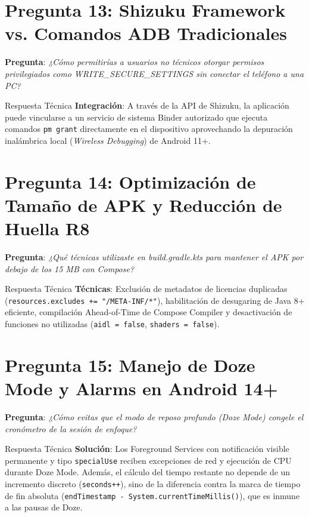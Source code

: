 \documentclass[11pt,a4paper,oneside]{report}
\begin{document}
\section{Pregunta 13: Shizuku Framework vs. Comandos ADB Tradicionales}
\textbf{Pregunta}: \textit{¿Cómo permitirías a usuarios no técnicos otorgar permisos privilegiados como WRITE\_SECURE\_SETTINGS sin conectar el teléfono a una PC?}
\begin{starbox}{Respuesta Técnica}
\textbf{Integración}: A través de la API de Shizuku, la aplicación puede vincularse a un servicio de sistema Binder autorizado que ejecuta comandos \texttt{pm grant} directamente en el dispositivo aprovechando la depuración inalámbrica local (\textit{Wireless Debugging}) de Android 11+.
\end{starbox}

\section{Pregunta 14: Optimización de Tamaño de APK y Reducción de Huella R8}
\textbf{Pregunta}: \textit{¿Qué técnicas utilizaste en build.gradle.kts para mantener el APK por debajo de los 15 MB con Compose?}
\begin{starbox}{Respuesta Técnica}
\textbf{Técnicas}: Exclusión de metadatos de licencias duplicadas (\texttt{resources.excludes += "/META-INF/*"}), habilitación de desugaring de Java 8+ eficiente, compilación Ahead-of-Time de Compose Compiler y desactivación de funciones no utilizadas (\texttt{aidl = false}, \texttt{shaders = false}).
\end{starbox}

\section{Pregunta 15: Manejo de Doze Mode y Alarms en Android 14+}
\textbf{Pregunta}: \textit{¿Cómo evitas que el modo de reposo profundo (Doze Mode) congele el cronómetro de la sesión de enfoque?}
\begin{starbox}{Respuesta Técnica}
\textbf{Solución}: Los Foreground Services con notificación visible permanente y tipo \texttt{specialUse} reciben excepciones de red y ejecución de CPU durante Doze Mode. Además, el cálculo del tiempo restante no depende de un incremento discreto (\texttt{seconds++}), sino de la diferencia contra la marca de tiempo de fin absoluta (\texttt{endTimestamp - System.currentTimeMillis()}), que es inmune a las pausas de Doze.
\end{starbox}
\end{document}
